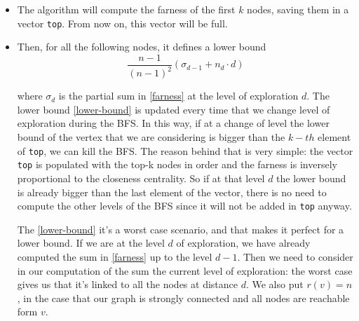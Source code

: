 \begin{itemize}
    \item The algorithm will compute the farness of the first $k$ nodes, saving them in a vector \texttt{top}. From now on, this vector will be full.

    \item Then, for all the following nodes, it defines a lower bound
    \begin{equation}\label{lower-bound}
        \frac{n-1}{(n-1)^2} (\sigma_{d-1} + n_d \cdot d)
    \end{equation}

    where $\sigma_d$ is the partial sum in \eqref{farness} at the level of exploration $d$. The lower bound \eqref{lower-bound} is updated every time that we change level of exploration during the BFS. In this way, if at a change of level the lower bound of the vertex that we are considering is bigger than the $k-th$ element of \texttt{top}, we can kill the BFS. The reason behind that is very simple: the vector \texttt{top} is populated with the top-k nodes in order and the farness is inversely proportional to the closeness centrality. So if at that level $d$ the lower bound is already bigger than the last element of the vector, there is no need to compute the other levels of the BFS since it will not be added in \texttt{top} anyway. \s

    The \eqref{lower-bound} it's a worst case scenario, and that makes it perfect for a lower bound. If we are at the level $d$ of exploration, we have already computed the sum in \eqref{farness} up to the level $d-1$. Then we need to consider in our computation of the sum the current level of exploration: the worst case gives us that it's linked to all the nodes at distance $d$. We also put $r(v)=n$, in the case that our graph is strongly connected and all nodes are reachable form $v$.
\end{itemize}

